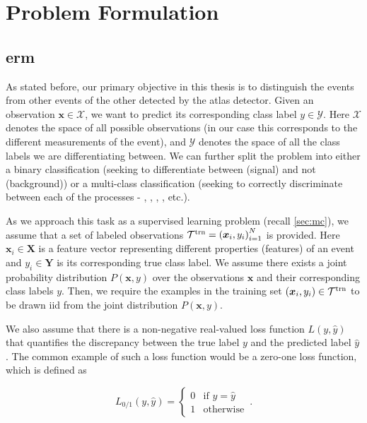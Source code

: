 \section{Problem Formulation}
\label{sec:formulation}


\subsection[Empirical Risk Minimization]{\gls{erm}}

As stated before, our primary objective in this thesis is to distinguish the \tth events from other events of the other
detected by the \gls{atlas} detector. Given an observation $\bm{x} \in \mathcal{X}$, we want to predict its
corresponding class label $y \in \mathcal{Y}$. Here $\mathcal{X}$ denotes the space of all possible observations (in
our case this corresponds to the different measurements of the event), and $\mathcal{Y}$ denotes the space of all
the class labels we are differentiating between. We can further split the problem into either a binary classification
(seeking to differentiate between \tth (signal) and not \tth (background)) or a multi-class classification (seeking to
correctly discriminate between each of the processes - \tth, \ttw, \ttz, \ttbar, etc.).

As we approach this task as a supervised learning problem (recall \autoref{sec:mc}), we assume that a set of labeled
observations ${\mathcal{T}^\text{trn}} = {(\bm{x}_i, y_i)}_{i=1}^N$ is provided.  Here $\bm{x}_i \in \mathbf{X}$ is a feature vector
representing different properties (features) of an event and $y_i \in \mathbf{Y}$ is its corresponding true class label.
We assume there exists a joint probability distribution $P(\bm{x}, y)$ over the observations $\bm{x}$ and their
corresponding class labels $y$. Then, we require the examples in the training set $(\bm{x}_i, y_i) \in {\mathcal{T}^\text{trn}}$ to be
drawn \gls{iid} from the joint distribution $P(\bm{x}, y)$.


We also assume that there is a non-negative real-valued loss function $L(y, \hat{y})$ that quantifies the
discrepancy between the true label $y$ and the predicted label $\hat{y}$. The common example of such a loss function
would be a zero-one loss function, which is defined as

\begin{equation}
    L_{0/1}(y, \hat{y}) = \begin{cases}
        0 & \text{if } y = \hat{y} \\
        1 & \text{otherwise}
    \end{cases}\,.
\end{equation}

